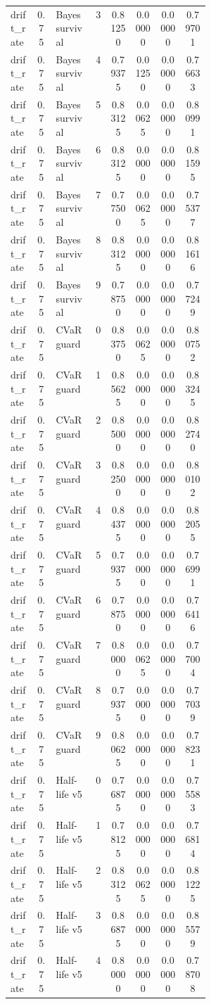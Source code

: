 \documentclass{article}
\begin{document}
\begin{center}
\begin{longtable}{p{0.13\linewidth}cp{0.20\linewidth}ccccc}
drift\_rate & 0.75 & Bayes survival & 3 & 0.81250 & 0.00000 & 0.00000 & 0.79701\\
drift\_rate & 0.75 & Bayes survival & 4 & 0.79375 & 0.01250 & 0.00000 & 0.76633\\
drift\_rate & 0.75 & Bayes survival & 5 & 0.83125 & 0.00625 & 0.00000 & 0.80991\\
drift\_rate & 0.75 & Bayes survival & 6 & 0.83125 & 0.00000 & 0.00000 & 0.81595\\
drift\_rate & 0.75 & Bayes survival & 7 & 0.77500 & 0.00625 & 0.00000 & 0.75377\\
drift\_rate & 0.75 & Bayes survival & 8 & 0.83125 & 0.00000 & 0.00000 & 0.81616\\
drift\_rate & 0.75 & Bayes survival & 9 & 0.78750 & 0.00000 & 0.00000 & 0.77249\\
drift\_rate & 0.75 & CVaR guard & 0 & 0.83750 & 0.00625 & 0.00000 & 0.80752\\
drift\_rate & 0.75 & CVaR guard & 1 & 0.85625 & 0.00000 & 0.00000 & 0.83245\\
drift\_rate & 0.75 & CVaR guard & 2 & 0.85000 & 0.00000 & 0.00000 & 0.82740\\
drift\_rate & 0.75 & CVaR guard & 3 & 0.82500 & 0.00000 & 0.00000 & 0.80102\\
drift\_rate & 0.75 & CVaR guard & 4 & 0.84375 & 0.00000 & 0.00000 & 0.82055\\
drift\_rate & 0.75 & CVaR guard & 5 & 0.79375 & 0.00000 & 0.00000 & 0.76991\\
drift\_rate & 0.75 & CVaR guard & 6 & 0.78750 & 0.00000 & 0.00000 & 0.76416\\
drift\_rate & 0.75 & CVaR guard & 7 & 0.80000 & 0.00625 & 0.00000 & 0.77004\\
drift\_rate & 0.75 & CVaR guard & 8 & 0.79375 & 0.00000 & 0.00000 & 0.77039\\
drift\_rate & 0.75 & CVaR guard & 9 & 0.80625 & 0.00000 & 0.00000 & 0.78231\\
drift\_rate & 0.75 & Half-life v5 & 0 & 0.76875 & 0.00000 & 0.00000 & 0.75583\\
drift\_rate & 0.75 & Half-life v5 & 1 & 0.78125 & 0.00000 & 0.00000 & 0.76814\\
drift\_rate & 0.75 & Half-life v5 & 2 & 0.83125 & 0.00625 & 0.00000 & 0.81225\\
drift\_rate & 0.75 & Half-life v5 & 3 & 0.86875 & 0.00000 & 0.00000 & 0.85579\\
drift\_rate & 0.75 & Half-life v5 & 4 & 0.80000 & 0.00000 & 0.00000 & 0.78708\\

\end{longtable}
\end{center}
\end{document}
